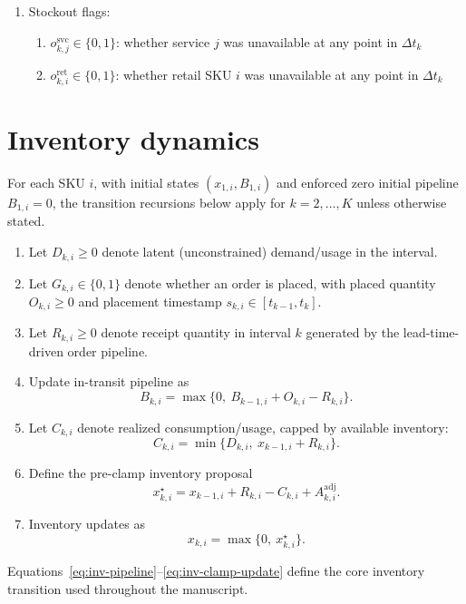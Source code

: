 \documentclass[11pt]{article}
\begin{document}
\begin{enumerate}
  \item Stockout flags:
  \begin{enumerate}
    \item $o^{\mathrm{svc}}_{k,j} \in \{0,1\}$: whether service $j$ was unavailable at any point in $\Delta t_k$
    \item $o^{\mathrm{ret}}_{k,i} \in \{0,1\}$: whether retail SKU $i$ was unavailable at any point in $\Delta t_k$
  \end{enumerate}
\end{enumerate}

\section{Inventory dynamics}

For each SKU $i$, with initial states $(x_{1,i},B_{1,i})$ and enforced zero initial pipeline $B_{1,i}=0$, the transition recursions below apply for $k=2,\dots,K$ unless otherwise stated.
\begin{enumerate}
  \item Let $D_{k,i}\ge 0$ denote latent (unconstrained) demand/usage in the interval.
  \item Let $G_{k,i}\in\{0,1\}$ denote whether an order is placed, with placed quantity $O_{k,i}\ge0$ and placement timestamp $s_{k,i}\in[t_{k-1},t_k]$.
  \item Let $R_{k,i}\ge0$ denote receipt quantity in interval $k$ generated by the lead-time-driven order pipeline.
  \item Update in-transit pipeline as
  \begin{equation}\label{eq:inv-pipeline}
    B_{k,i}=\max\bigl\{0,\ B_{k-1,i}+O_{k,i}-R_{k,i}\bigr\}.
  \end{equation}
  \item Let $C_{k,i}$ denote realized consumption/usage, capped by available inventory:
  \begin{equation}\label{eq:inv-consumption-cap}
    C_{k,i} = \min\bigl\{D_{k,i},\ x_{k-1,i} + R_{k,i}\bigr\}.
  \end{equation}
  \item Define the pre-clamp inventory proposal
  \begin{equation}\label{eq:inv-preclamp}
    x^\star_{k,i} = x_{k-1,i} + R_{k,i} - C_{k,i} + A^{\mathrm{adj}}_{k,i}.
  \end{equation}
  \item Inventory updates as
  \begin{equation}\label{eq:inv-clamp-update}
    x_{k,i} = \max\bigl\{0,\ x^\star_{k,i}\bigr\}.
  \end{equation}
\end{enumerate}
Equations~\eqref{eq:inv-pipeline}--\eqref{eq:inv-clamp-update} define the core inventory transition used throughout the manuscript.
\end{document}
